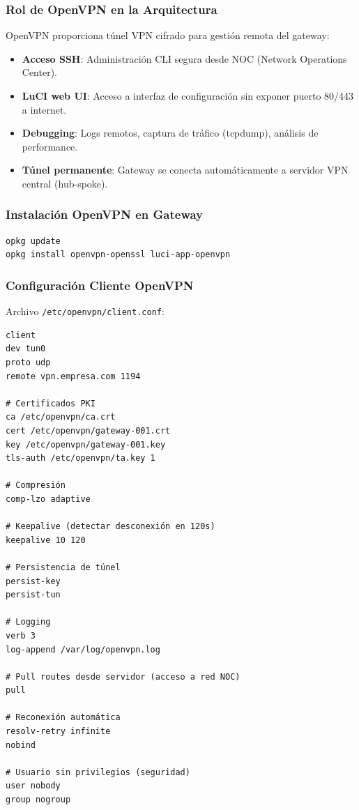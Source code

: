 \subsubsection{Rol de OpenVPN en la Arquitectura}

OpenVPN proporciona túnel VPN cifrado para gestión remota del gateway:

\begin{itemize}
    \item \textbf{Acceso SSH}: Administración CLI segura desde NOC (Network Operations Center).
    \item \textbf{LuCI web UI}: Acceso a interfaz de configuración sin exponer puerto 80/443 a internet.
    \item \textbf{Debugging}: Logs remotos, captura de tráfico (tcpdump), análisis de performance.
    \item \textbf{Túnel permanente}: Gateway se conecta automáticamente a servidor VPN central (hub-spoke).
\end{itemize}

\subsubsection{Instalación OpenVPN en Gateway}

\begin{verbatim}
opkg update
opkg install openvpn-openssl luci-app-openvpn
\end{verbatim}

\subsubsection{Configuración Cliente OpenVPN}

Archivo \texttt{/etc/openvpn/client.conf}:
\begin{verbatim}
client
dev tun0
proto udp
remote vpn.empresa.com 1194

# Certificados PKI
ca /etc/openvpn/ca.crt
cert /etc/openvpn/gateway-001.crt
key /etc/openvpn/gateway-001.key
tls-auth /etc/openvpn/ta.key 1

# Compresión
comp-lzo adaptive

# Keepalive (detectar desconexión en 120s)
keepalive 10 120

# Persistencia de túnel
persist-key
persist-tun

# Logging
verb 3
log-append /var/log/openvpn.log

# Pull routes desde servidor (acceso a red NOC)
pull

# Reconexión automática
resolv-retry infinite
nobind

# Usuario sin privilegios (seguridad)
user nobody
group nogroup
\end{verbatim}

